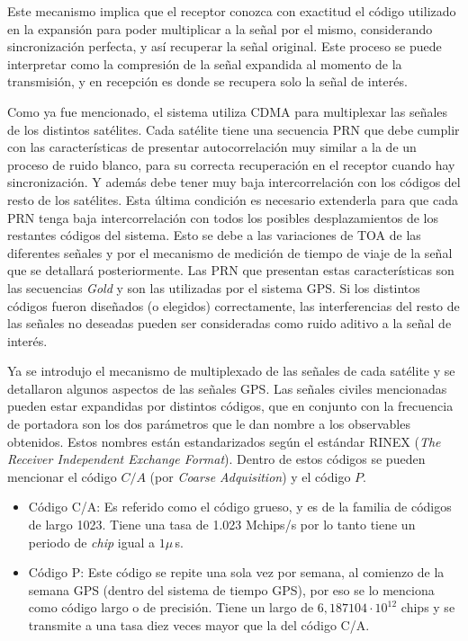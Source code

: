 \documentclass[a4paper,12pt,oneside,onecolumn,final,openright]{book}%
\begin{document}
	Este mecanismo implica que el receptor conozca con exactitud el código utilizado en la expansión para poder multiplicar a la señal por el mismo, considerando sincronización perfecta, y así recuperar la señal original. Este proceso se puede interpretar como la compresión de la señal expandida al momento de la transmisión, y en recepción es donde se recupera solo la señal de interés.
	
	Como ya fue mencionado, el sistema utiliza CDMA para multiplexar las señales de los distintos satélites. Cada satélite tiene una secuencia PRN que debe cumplir con las características de presentar autocorrelación muy similar a la de un proceso de ruido blanco, para su correcta recuperación en el receptor cuando hay sincronización. Y además debe tener muy baja intercorrelación con los códigos del resto de los satélites. Esta última condición es necesario extenderla para que cada PRN tenga baja intercorrelación con todos los posibles desplazamientos de los restantes códigos del sistema. Esto se debe a las variaciones de TOA de las diferentes señales y por el mecanismo de medición de tiempo de viaje de la señal que se detallará posteriormente. Las PRN que presentan estas características son las secuencias \textit{Gold} \cite{proakis} y son las utilizadas por el sistema GPS. Si los distintos códigos fueron diseñados (o elegidos) correctamente, las interferencias del resto de las señales no deseadas pueden ser consideradas como ruido aditivo a la señal de interés.
	
	Ya se introdujo el mecanismo de multiplexado de las señales de cada satélite y se detallaron algunos aspectos de las señales GPS. Las señales civiles mencionadas pueden estar expandidas por distintos códigos, que en conjunto con la frecuencia de portadora son los dos parámetros que le dan nombre a los observables obtenidos. Estos nombres están estandarizados según el estándar RINEX (\textit{The Receiver Independent Exchange Format})\cite{rinex}. Dentro de estos códigos se pueden mencionar el código $C/A$ (por \textit{Coarse Adquisition}) y el código $P$.
\begin{itemize}
	\item Código C/A: Es referido como el código grueso, y es de la familia de códigos de largo 1023. Tiene una tasa de 1.023 Mchips/s por lo tanto tiene un periodo de \textit{chip} igual a $1\mu$\,s.
	\item Código P: Este código se repite una sola vez por semana, al comienzo de la semana GPS (dentro del sistema de tiempo GPS), por eso se lo menciona como código largo o de precisión. Tiene un largo de $6,187104\cdot 10^{12}$ chips y se transmite a una tasa diez veces mayor que la del código C/A.
\end{itemize}
\end{document}
